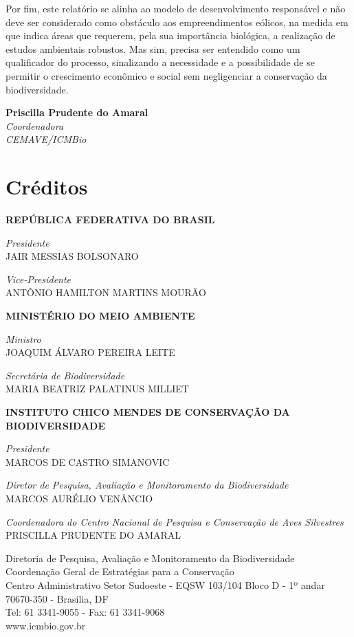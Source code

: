\documentclass[
  oneside]{scrbook}
\begin{document}
Por fim, este relatório se alinha ao modelo de desenvolvimento responsável e não deve ser considerado como obstáculo aos empreendimentos eólicos, na medida em que indica áreas que requerem, pela sua importância biológica, a realização de estudos ambientais robustos. Mas sim, precisa ser entendido como um qualificador do processo, sinalizando a necessidade e a possibilidade de se permitir o crescimento econômico e social sem negligenciar a conservação da biodiversidade.

\textbf{Priscilla Prudente do Amaral}\\
\emph{Coordenadora}\\
\emph{CEMAVE/ICMBio}

\hypertarget{creditos}{%
\chapter*{Créditos}\label{creditos}}

\textbf{REPÚBLICA FEDERATIVA DO BRASIL}

\emph{Presidente}\\
JAIR MESSIAS BOLSONARO

\emph{Vice-Presidente}\\
ANTÔNIO HAMILTON MARTINS MOURÃO

\textbf{MINISTÉRIO DO MEIO AMBIENTE}

\emph{Ministro}\\
JOAQUIM ÁLVARO PEREIRA LEITE

\emph{Secretária de Biodiversidade}\\
MARIA BEATRIZ PALATINUS MILLIET

\textbf{INSTITUTO CHICO MENDES DE CONSERVAÇÃO DA BIODIVERSIDADE}

\emph{Presidente}\\
MARCOS DE CASTRO SIMANOVIC

\emph{Diretor de Pesquisa, Avaliação e Monitoramento da Biodiversidade}\\
MARCOS AURÉLIO VENÂNCIO

\emph{Coordenadora do Centro Nacional de Pesquisa e Conservação de Aves Silvestres}\\
PRISCILLA PRUDENTE DO AMARAL

Diretoria de Pesquisa, Avaliação e Monitoramento da Biodiversidade\\
Coordenação Geral de Estratégias para a Conservação\\
Centro Administrativo Setor Sudoeste - EQSW 103/104 Bloco D - 1º andar\\
70670-350 - Brasília, DF\\
Tel: 61 3341-9055 - Fax: 61 3341-9068\\
www.icmbio.gov.br
\end{document}
